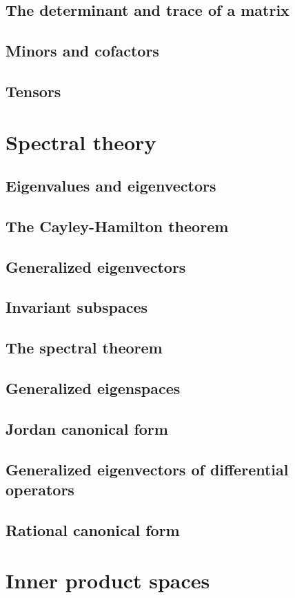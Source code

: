 \documentclass{article}
\begin{document}
\subsection{The determinant and trace of a matrix}
\subsection{Minors and cofactors}
\subsection{Tensors}
\section{Spectral theory}
\subsection{Eigenvalues and eigenvectors}
\subsection{The Cayley-Hamilton theorem}
\subsection{Generalized eigenvectors}
\subsection{Invariant subspaces}
\subsection{The spectral theorem}
\subsection{Generalized eigenspaces}
\subsection{Jordan canonical form}
\subsection{Generalized eigenvectors of differential operators}
\subsection{Rational canonical form}
\section{Inner product spaces}
\end{document}
